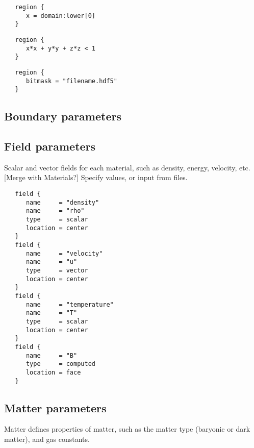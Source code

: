 \begin{verbatim}
   region {
      x = domain:lower[0]
   }
\end{verbatim}

\begin{verbatim}
   region {
      x*x + y*y + z*z < 1
   }
\end{verbatim}

\begin{verbatim}
   region {
      bitmask = "filename.hdf5"
   }
\end{verbatim}


\subsection{Boundary parameters}

\subsection{Field parameters}

Scalar and vector fields for each material, such as
 density, energy, velocity, etc.  [Merge with Materials?]  Specify
 values, or input from files.

\begin{verbatim}
   field {
      name     = "density"
      name     = "rho"
      type     = scalar
      location = center
   }
   field {
      name     = "velocity"
      name     = "u"
      type     = vector
      location = center
   }
   field {
      name     = "temperature"
      name     = "T"
      type     = scalar
      location = center
   }
   field {
      name     = "B"
      type     = computed
      location = face
   }
\end{verbatim}

\subsection{Matter parameters} \label{s:params-matter}

 Matter defines properties of matter, such as the matter type (baryonic
 or dark matter), and gas constants.

